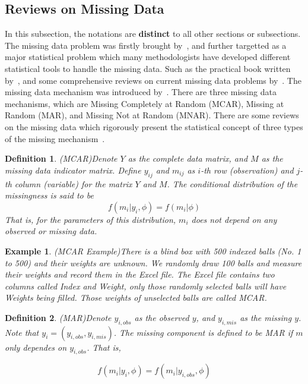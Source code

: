 \documentclass[preprint,12pt]{elsarticle}
\newtheorem{defn}{Definition}
\newtheorem{eg}{Example}
\begin{document}
\subsection{Reviews on Missing Data}
In this subsection, the notations are \textbf{distinct} to all other sections or subsections. 
The missing data problem was firstly brought by~\citet{rubin1976inference}, and further targetted as a major statistical problem which many methodologists have developed different statistical tools to handle the missing data. 
Such as the practical book written by~\citet{Rubin1987}, and some comprehensive reviews on current missing data problems by~\citet{baraldi2010introduction}. 
The missing data mechanism was introduced by~\citet{little2019statistical}. 
There are three missing data mechanisms, which are Missing Completely at Random (MCAR), Missing at Random (MAR), and Missing Not at Random (MNAR). 
There are some reviews on the missing data which rigorously present the statistical concept of three types of the missing mechanism~\cite{santos2019generating}.
\begin{defn}(MCAR)\label{defn:MCAR}
Denote $Y$ as the complete data matrix, and $M$ as the missing data indicator matrix. 
Define $y_{ij}$ and $m_{ij}$ as $i$-th row (observation) and $j$-th column (variable) for the matrix $Y$ and $M$. 
The conditional distribution of the missingness is said to be 
\begin{equation} 
    f(m_i|y_i, \phi)=f(m_i|\phi)
\end{equation}
That is, for the parameters of this distribution, $m_i$ does not depend on any observed or missing data.
\end{defn}
\begin{eg}(MCAR Example)\label{eg:MCARExample}
    There is a blind box with 500 indexed balls (No. 1 to 500) and their weights are unknown. 
    We randomly draw 100 balls and measure their weights and record them in the Excel file. 
    The Excel file contains two columns called Index and Weight, only those randomly selected balls will have Weights being filled. 
    Those weights of unselected balls are called MCAR. 
\end{eg}
\begin{defn}(MAR)\label{defn:MAR}
    Denote $y_{i,obs}$ as the observed $y$, and $y_{i,mis}$ as the missing $y$. 
    Note that $y_i=(y_{i,obs},y_{i,mis})$. 
    The missing component is defined to be MAR if $m$ only dependes on $y_{i,obs}$. 
    That is,

    \begin{equation} 
        f(m_i|y_i,\phi)=f(m_i|y_{i,obs}, \phi)
    \end{equation}
\end{defn}
\end{document}
